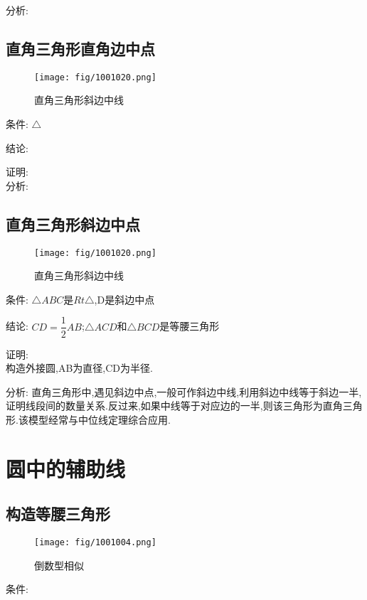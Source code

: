 \documentclass[cn,blue,10pt]{elegantbook}
\begin{document}
分析: 
\subsection{直角三角形直角边中点}%
\label{sub:直角三角形直角边中点}

\begin{figure}[H]
    \centering
    \texttt{[image: fig/1001020.png]}
    \caption{直角三角形斜边中线}%
    \label{fig:倒数型相似}
\end{figure}
条件: \(\triangle \) 

结论: \( \) 

证明:\\

分析: 
\subsection{直角三角形斜边中点}%
\label{sub:直角三角形斜边中点}

\begin{figure}[h]
    \centering
    \texttt{[image: fig/1001020.png]}
    \caption{直角三角形斜边中线}%
    \label{fig:倒数型相似}
\end{figure}
条件: \(\triangle ABC\)是\(Rt\triangle\),D是斜边中点 

结论: \(CD=\dfrac{1}{2}AB\);\(\triangle ACD\)和\(\triangle BCD\)是等腰三角形

证明:\\
构造外接圆,AB为直径,CD为半径.

分析: 直角三角形中,遇见斜边中点,一般可作斜边中线,利用斜边中线等于斜边一半,证明线段间的数量关系.反过来,如果中线等于对应边的一半,则该三角形为直角三角形.该模型经常与中位线定理综合应用.




\section{圆中的辅助线}%
\label{sec:圆中的辅助线}

\subsection{构造等腰三角形}%
\label{sub:构造等腰三角形}

\begin{figure}[h]
    \centering
    \texttt{[image: fig/1001004.png]}
    \caption{倒数型相似}%
    \label{fig:倒数型相似}
\end{figure}
条件: \(\) 
\end{document}
